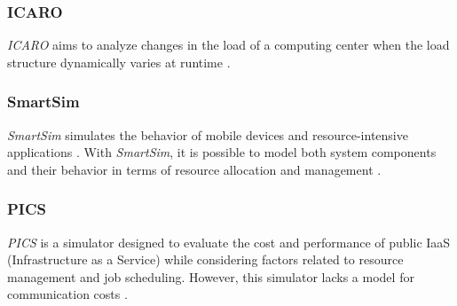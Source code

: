 {\subsubsection{ICARO}
\emph{ICARO} \cite{badii2016icaro} aims to analyze changes in the load of a computing center when the load structure dynamically varies at runtime \cite{khalil2017cloud}.

\subsubsection{SmartSim}
\emph{SmartSim} \cite{shiraz2012extendable} simulates the behavior of mobile devices and resource-intensive applications \cite{khalil2017cloud}. With \emph{SmartSim}, it is possible to model both system components and their behavior in terms of resource allocation and management \cite{suryateja2016comparative}.

\subsubsection{PICS}
\emph{PICS} \cite{kim2015pics} is a simulator designed to evaluate the cost and performance of public IaaS (Infrastructure as a Service) while considering factors related to resource management and job scheduling. However, this simulator lacks a model for communication costs \cite{suryateja2016comparative}.


}

